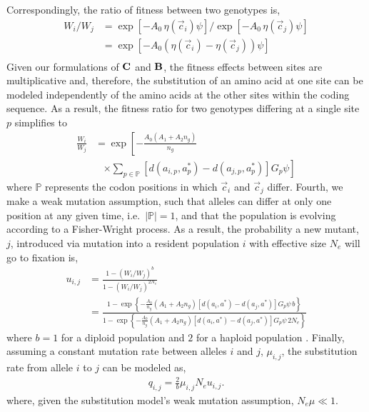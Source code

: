 \documentclass[12pt,letterpaper]{article}
\newcommand{\Cost}{\ensuremath{\text{\textbf{C}}}\xspace}
\newcommand{\Func}{\ensuremath{\text{\textbf{B}}}\xspace}
\newcommand{\Ne}{\ensuremath{{N_e}}\xspace} %
\newcommand{\aip}{\ensuremath{a_{i,p}}\xspace}
\newcommand{\ajp}{\ensuremath{a_{j,p}}\xspace}
\newcommand{\aopt}{\ensuremath{a^*}\xspace}
\newcommand{\aoptp}{\ensuremath{a^*_p}\xspace}
\newcommand{\cveci}{\ensuremath{\cvec_i}\xspace}
\newcommand{\cvecj}{\ensuremath{\cvec_j}\xspace}
\newcommand{\cvec}{\ensuremath{\Vec{c}}\xspace}
\newcommand{\muij}{\ensuremath{\mu_{i,j}}\xspace}
\newcommand{\setP}{\ensuremath{\mathbb{P}}\xspace}
\renewcommand{\ng}{\ensuremath{{n_g}}\xspace}
\begin{document}
Correspondingly, the ratio of fitness between two genotypes is,
\begin{align}
  W_i/W_j &=  \exp\left[- A_0 \, \eta(\cveci) \psi\right]/\exp\left[- A_0 \, \eta(\cvecj) \psi\right]\\
  &=  \exp\left[- A_0 \left(\eta(\cveci)- \eta(\cvecj)\right) \psi\right] \label{eq:Wratio}\\
\end{align}
Given our formulations of \Cost and \Func, the fitness effects between sites are multiplicative and, therefore, the substitution of an amino acid at one site can be modeled independently of the amino acids at the other sites within the coding sequence.
As a result, the fitness ratio for two genotypes differing at a single site $p$ simplifies to
\begin{align*}
  \frac{W_i}{W_j}  &= \exp\left[- \frac{A_0 \left(A_1 + A_2 \ng\right)}{\ng} \right.\\
  & \;\;\;  \left. \times \sum_{p \in \setP} \left[d\left(\aip,\aoptp\right) - d\left(\ajp,\aoptp\right)\right] G_p \psi \right]
\end{align*}
where \setP represents the codon positions in which \cveci and \cvecj differ.
Fourth, we make a weak mutation assumption, such that alleles can differ at only one position at any given time, i.e.~$|\setP| = 1$, and that the population is evolving according to a Fisher-Wright process.
As a result, the probability a new mutant, $j$, introduced via mutation into a resident population $i$ with effective size \Ne will go to fixation is,
\begin{align*}
  u_{i,j} &=  \frac{1 - \left(W_i/W_j\right)^b}{1 - \left(W_i/W_j\right)^{2 \Ne}}\\
   &= \frac{1- \exp\left\{- \frac{A_0}{\ng} \left(A_1 + A_2 \ng\right) \left[d\left(a_i,\aopt\right) - d\left(a_j,\aopt\right)\right] G_p \psi \,  b\right\}}  {1-\exp\left\{- \frac{A_0}{\ng} \left(A_1 + A_2 \ng\right) \left[d\left(a_i,\aopt\right) - d\left(a_j,\aopt\right)\right] G_p \psi \, 2\Ne\right\}}
\end{align*}
where $b=1$ for a diploid population and $2$ for a haploid population \citep{Kimura1962,Wright1969,Iwasa1988,BergAndLassig2003,SellaAndHirsh2005}.
Finally, assuming a constant mutation rate between alleles $i$ and $j$, $\muij$, the substitution rate from allele $i$ to $j$ can be modeled as,
\begin{align*}
  q_{i,j} = \frac{2}{b} \muij \Ne u_{i,j}.
\end{align*}
where, given the substitution model's weak mutation assumption, $\Ne \mu \ll 1$.
\end{document}
